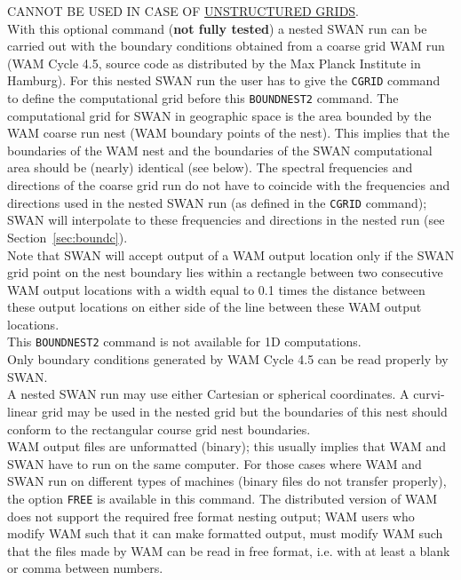 \documentclass[12pt]{book}
\begin{document}
\noindent
CANNOT BE USED IN CASE OF \underline{UNSTRUCTURED GRIDS}.
\\[2ex]
\noindent
With this optional command ({\bf not fully tested}) a nested SWAN run can be carried out with the boundary
conditions obtained from a coarse grid WAM run (WAM Cycle 4.5, source code as distributed by the
Max Planck Institute in Hamburg). For this nested SWAN run the user has to give the {\tt CGRID} command
to define the computational grid before this {\tt BOUNDNEST2} command. The computational grid for SWAN
in geographic space is the area bounded by the WAM coarse run nest (WAM boundary points of the nest).
This implies that the boundaries of the WAM nest and the boundaries of the SWAN computational area
should be (nearly) identical (see below). The spectral frequencies and directions of the coarse grid run
do not have to coincide with the frequencies and directions used in the nested SWAN run (as defined in
the {\tt CGRID} command); SWAN will interpolate to these frequencies and directions in the nested run (see
Section~\ref{sec:boundc}).
\\[2ex]
\noindent
Note that SWAN will accept output of a WAM output location only if the SWAN grid point on the nest
boundary lies within a rectangle between two consecutive WAM output locations with a width equal to 0.1
times the distance between these output locations on either side of the line between these WAM output
locations.
\\[2ex]
\noindent
This {\tt BOUNDNEST2} command is not available for 1D computations.
\\[2ex]
\noindent
Only boundary conditions generated by WAM Cycle 4.5 can be read properly by SWAN.
\\[2ex]
\noindent
A nested SWAN run may use either Cartesian or spherical coordinates. A curvi-linear grid may be used
in the nested grid but the boundaries of this nest should conform to the rectangular course grid nest
boundaries.
\\[2ex]
\noindent
WAM output files are unformatted (binary); this usually implies that WAM and SWAN have to run on the
same computer. For those cases where WAM and SWAN run on different types of machines (binary files
do not transfer properly), the option {\tt FREE} is available in this command. The distributed version of WAM
does not support the required free format nesting output; WAM users who modify WAM such that it can
make formatted output, must modify WAM such that the files made by WAM can be read in free format, i.e.
with at least a blank or comma between numbers.
\end{document}
